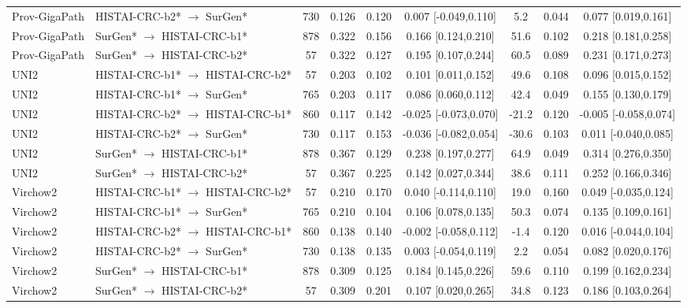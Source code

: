 \begin{table}[htbp]
{\begin{tabular}{l l c c c c c c c}
Prov-GigaPath & HISTAI-CRC-b2* $\rightarrow$ SurGen* & 730 & 0.126 & 0.120 & 0.007 [-0.049,0.110] & 5.2 & 0.044 & 0.077 [0.019,0.161] \\
Prov-GigaPath & SurGen* $\rightarrow$ HISTAI-CRC-b1* & 878 & 0.322 & 0.156 & 0.166 [0.124,0.210] & 51.6 & 0.102 & 0.218 [0.181,0.258] \\
Prov-GigaPath & SurGen* $\rightarrow$ HISTAI-CRC-b2* & 57 & 0.322 & 0.127 & 0.195 [0.107,0.244] & 60.5 & 0.089 & 0.231 [0.171,0.273] \\
UNI2 & HISTAI-CRC-b1* $\rightarrow$ HISTAI-CRC-b2* & 57 & 0.203 & 0.102 & 0.101 [0.011,0.152] & 49.6 & 0.108 & 0.096 [0.015,0.152] \\
UNI2 & HISTAI-CRC-b1* $\rightarrow$ SurGen* & 765 & 0.203 & 0.117 & 0.086 [0.060,0.112] & 42.4 & 0.049 & 0.155 [0.130,0.179] \\
UNI2 & HISTAI-CRC-b2* $\rightarrow$ HISTAI-CRC-b1* & 860 & 0.117 & 0.142 & -0.025 [-0.073,0.070] & -21.2 & 0.120 & -0.005 [-0.058,0.074] \\
UNI2 & HISTAI-CRC-b2* $\rightarrow$ SurGen* & 730 & 0.117 & 0.153 & -0.036 [-0.082,0.054] & -30.6 & 0.103 & 0.011 [-0.040,0.085] \\
UNI2 & SurGen* $\rightarrow$ HISTAI-CRC-b1* & 878 & 0.367 & 0.129 & 0.238 [0.197,0.277] & 64.9 & 0.049 & 0.314 [0.276,0.350] \\
UNI2 & SurGen* $\rightarrow$ HISTAI-CRC-b2* & 57 & 0.367 & 0.225 & 0.142 [0.027,0.344] & 38.6 & 0.111 & 0.252 [0.166,0.346] \\
Virchow2 & HISTAI-CRC-b1* $\rightarrow$ HISTAI-CRC-b2* & 57 & 0.210 & 0.170 & 0.040 [-0.114,0.110] & 19.0 & 0.160 & 0.049 [-0.035,0.124] \\
Virchow2 & HISTAI-CRC-b1* $\rightarrow$ SurGen* & 765 & 0.210 & 0.104 & 0.106 [0.078,0.135] & 50.3 & 0.074 & 0.135 [0.109,0.161] \\
Virchow2 & HISTAI-CRC-b2* $\rightarrow$ HISTAI-CRC-b1* & 860 & 0.138 & 0.140 & -0.002 [-0.058,0.112] & -1.4 & 0.120 & 0.016 [-0.044,0.104] \\
Virchow2 & HISTAI-CRC-b2* $\rightarrow$ SurGen* & 730 & 0.138 & 0.135 & 0.003 [-0.054,0.119] & 2.2 & 0.054 & 0.082 [0.020,0.176] \\
Virchow2 & SurGen* $\rightarrow$ HISTAI-CRC-b1* & 878 & 0.309 & 0.125 & 0.184 [0.145,0.226] & 59.6 & 0.110 & 0.199 [0.162,0.234] \\
Virchow2 & SurGen* $\rightarrow$ HISTAI-CRC-b2* & 57 & 0.309 & 0.201 & 0.107 [0.020,0.265] & 34.8 & 0.123 & 0.186 [0.103,0.264] \\

\end{tabular}}
\end{table}
